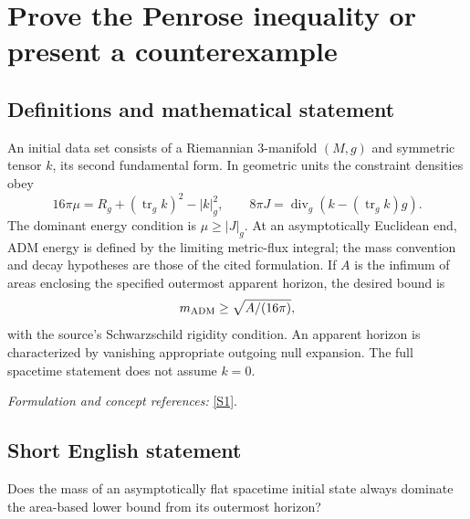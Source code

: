 \documentclass[11pt,a4paper]{article}
\newcommand{\sref}[2]{\hyperlink{source:#1:#2}{[S#2]}}
\newif\ifshowcatalogue
\newcommand{\cataloguescope}[1]{\ifshowcatalogue
 \paragraph{Exact scope in the supplied catalogue.}
 \begin{quote}\small #1\end{quote}\fi}
\numberwithin{equation}{section}
\begin{document}
\setcounter{section}{36}
\clearpage
\section{\texorpdfstring{Prove the Penrose inequality or present a counterexample}{Prove the Penrose inequality or present a counterexample}}\label{37}
\subsection{Definitions and mathematical statement}
An initial data set consists of a Riemannian $3$-manifold $(M,g)$ and symmetric tensor $k$, its second fundamental form. In geometric units the constraint densities obey
\[
 16\pi\mu=R_g+(\operatorname{tr}_gk)^2-|k|_g^2,\qquad
 8\pi J=\operatorname{div}_g(k-(\operatorname{tr}_gk)g).
\]
The dominant energy condition is $\mu\ge|J|_g$. At an asymptotically Euclidean end, ADM energy is defined by the limiting metric-flux integral; the mass convention and decay hypotheses are those of the cited formulation. If $A$ is the infimum of areas enclosing the specified outermost apparent horizon, the desired bound is
\[
 m_{\rm ADM}\ge\sqrt{A/(16\pi)},
\]
with the source's Schwarzschild rigidity condition. An apparent horizon is characterized by vanishing appropriate outgoing null expansion. The full spacetime statement does not assume $k=0$.
\par\smallskip\textit{Formulation and concept references:} \sref{37}{1}.
\cataloguescope{Let (M,g,k) be a three-dimensional asymptotically flat initial data set for the Einstein equations satisfying the dominant energy condition and containing an outermost apparent horizon. If A is the least area needed to enclose that horizon and m\_ADM is the ADM mass, prove the sharp spacetime Penrose inequality m\_ADM >= sqrt(A/(16*pi)), with the appropriate Schwarzschild rigidity statement, or construct initial data satisfying the hypotheses that violate the inequality.}
\subsection{Short English statement}
Does the mass of an asymptotically flat spacetime initial state always dominate the area-based lower bound from its outermost horizon?
\end{document}

